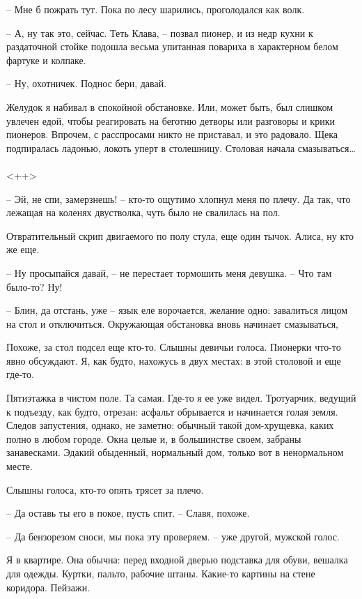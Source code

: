 \documentclass[a4paper]{book}
\begin{document}
-- Мне б пожрать тут. Пока по лесу шарились, проголодался как волк. 

-- А, ну так это, сейчас. Теть Клава, -- позвал пионер, и из недр кухни к раздаточной стойке подошла весьма упитанная повариха в характерном белом фартуке и колпаке.

-- Ну, охотничек. Поднос бери, давай.

Желудок я набивал в спокойной обстановке. Или, может быть, был слишком увлечен едой, чтобы реагировать на беготню детворы или разговоры и крики пионеров. Впрочем, с расспросами никто не приставал, и это радовало. Щека подпиралась ладонью, локоть уперт в столешницу. Столовая начала смазываться\ldots 

\paragraph{}<++>

-- Эй, не спи, замерзнешь! -- кто-то ощутимо хлопнул меня по плечу. Да так, что лежащая на коленях двустволка, чуть было не свалилась на пол. 

Отвратительный скрип двигаемого по полу стула, еще один тычок. Алиса, ну кто же еще.

-- Ну просыпайся давай, -- не перестает тормошить меня девушка. -- Что там было-то? Ну!

-- Блин, да отстань, уже -- язык еле ворочается, желание одно: завалиться лицом на стол и отключиться. Окружающая обстановка вновь начинает смазываться, 

Похоже, за стол подсел еще кто-то. Слышны девичьи голоса. Пионерки что-то явно обсуждают. Я, как будто, нахожусь в двух местах: в этой столовой и еще где-то. 

Пятиэтажка в чистом поле. Та самая. Где-то я ее уже видел. Тротуарчик, ведущий к подъезду, как будто, отрезан: асфальт обрывается и начинается голая земля. Следов запустения, однако, не заметно: обычный такой дом-хрущевка, каких полно в любом городе. Окна целые и, в большинстве своем, забраны занавесками.  Эдакий обыденный, нормальный дом, только вот в ненормальном месте. 

Слышны голоса, кто-то опять трясет за плечо. 

-- Да оставь ты его в покое, пусть спит. -- Славя, похоже.

-- Да бензорезом сноси, мы пока эту проверяем. -- уже другой, мужской голос.

Я в квартире. Она обычна: перед входной дверью подставка для обуви, вешалка для одежды. Куртки, пальто, рабочие штаны. Какие-то картины на стене коридора. Пейзажи.
\end{document}
